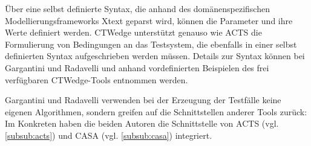 Über eine selbst definierte Syntax, die anhand des domänenspezifischen Modellierungsframeworks Xtext \cite{eysholdt2010xtext} geparst wird, können die Parameter und ihre Werte definiert werden. CTWedge unterstützt genauso wie ACTS die Formulierung von Bedingungen an das Testsystem, die ebenfalls in einer selbst definierten Syntax aufgeschrieben werden müssen. Details zur Syntax können bei Gargantini und Radavelli \cite{gargantini2018migrating} und anhand vordefinierten Beispielen des frei verfügbaren CTWedge-Tools \cite{ctwedge} entnommen werden.

Gargantini und Radavelli verwenden bei der Erzeugung der Testfälle keine eigenen Algorithmen, sondern greifen auf die Schnittstellen anderer Tools zurück: Im Konkreten haben die beiden Autoren die Schnittstelle von ACTS (vgl. \autoref{subsub:acts}) und CASA (vgl. \autoref{subsub:casa}) integriert.











